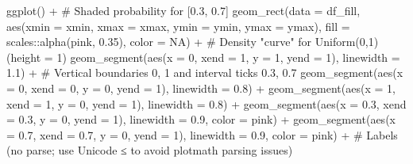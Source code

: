 \documentclass[
  letterpaper,
  DIV=11,
  numbers=noendperiod]{scrreprt}
\newenvironment{Shaded}{\begin{snugshade}}{\end{snugshade}}
\newcommand{\AttributeTok}[1]{\textcolor[rgb]{0.40,0.45,0.13}{#1}}
\newcommand{\CommentTok}[1]{\textcolor[rgb]{0.37,0.37,0.37}{#1}}
\newcommand{\ConstantTok}[1]{\textcolor[rgb]{0.56,0.35,0.01}{#1}}
\newcommand{\DecValTok}[1]{\textcolor[rgb]{0.68,0.00,0.00}{#1}}
\newcommand{\FloatTok}[1]{\textcolor[rgb]{0.68,0.00,0.00}{#1}}
\newcommand{\FunctionTok}[1]{\textcolor[rgb]{0.28,0.35,0.67}{#1}}
\newcommand{\NormalTok}[1]{\textcolor[rgb]{0.00,0.23,0.31}{#1}}
\newcommand{\SpecialCharTok}[1]{\textcolor[rgb]{0.37,0.37,0.37}{#1}}
\begin{document}
\begin{Shaded}
\begin{Highlighting}[]
\FunctionTok{ggplot}\NormalTok{() }\SpecialCharTok{+}
  \CommentTok{\# Shaded probability for [0.3, 0.7]}
  \FunctionTok{geom\_rect}\NormalTok{(}\AttributeTok{data =}\NormalTok{ df\_fill,}
            \FunctionTok{aes}\NormalTok{(}\AttributeTok{xmin =}\NormalTok{ xmin, }\AttributeTok{xmax =}\NormalTok{ xmax, }\AttributeTok{ymin =}\NormalTok{ ymin, }\AttributeTok{ymax =}\NormalTok{ ymax),}
            \AttributeTok{fill =}\NormalTok{ scales}\SpecialCharTok{::}\FunctionTok{alpha}\NormalTok{(pink, }\FloatTok{0.35}\NormalTok{), }\AttributeTok{color =} \ConstantTok{NA}\NormalTok{) }\SpecialCharTok{+}
  \CommentTok{\# Density "curve" for Uniform(0,1) (height = 1)}
  \FunctionTok{geom\_segment}\NormalTok{(}\FunctionTok{aes}\NormalTok{(}\AttributeTok{x =} \DecValTok{0}\NormalTok{, }\AttributeTok{xend =} \DecValTok{1}\NormalTok{, }\AttributeTok{y =} \DecValTok{1}\NormalTok{, }\AttributeTok{yend =} \DecValTok{1}\NormalTok{), }\AttributeTok{linewidth =} \FloatTok{1.1}\NormalTok{) }\SpecialCharTok{+}
  \CommentTok{\# Vertical boundaries 0, 1 and interval ticks 0.3, 0.7}
  \FunctionTok{geom\_segment}\NormalTok{(}\FunctionTok{aes}\NormalTok{(}\AttributeTok{x =} \DecValTok{0}\NormalTok{,   }\AttributeTok{xend =} \DecValTok{0}\NormalTok{,   }\AttributeTok{y =} \DecValTok{0}\NormalTok{, }\AttributeTok{yend =} \DecValTok{1}\NormalTok{), }\AttributeTok{linewidth =} \FloatTok{0.8}\NormalTok{) }\SpecialCharTok{+}
  \FunctionTok{geom\_segment}\NormalTok{(}\FunctionTok{aes}\NormalTok{(}\AttributeTok{x =} \DecValTok{1}\NormalTok{,   }\AttributeTok{xend =} \DecValTok{1}\NormalTok{,   }\AttributeTok{y =} \DecValTok{0}\NormalTok{, }\AttributeTok{yend =} \DecValTok{1}\NormalTok{), }\AttributeTok{linewidth =} \FloatTok{0.8}\NormalTok{) }\SpecialCharTok{+}
  \FunctionTok{geom\_segment}\NormalTok{(}\FunctionTok{aes}\NormalTok{(}\AttributeTok{x =} \FloatTok{0.3}\NormalTok{, }\AttributeTok{xend =} \FloatTok{0.3}\NormalTok{, }\AttributeTok{y =} \DecValTok{0}\NormalTok{, }\AttributeTok{yend =} \DecValTok{1}\NormalTok{),}
               \AttributeTok{linewidth =} \FloatTok{0.9}\NormalTok{, }\AttributeTok{color =}\NormalTok{ pink) }\SpecialCharTok{+}
  \FunctionTok{geom\_segment}\NormalTok{(}\FunctionTok{aes}\NormalTok{(}\AttributeTok{x =} \FloatTok{0.7}\NormalTok{, }\AttributeTok{xend =} \FloatTok{0.7}\NormalTok{, }\AttributeTok{y =} \DecValTok{0}\NormalTok{, }\AttributeTok{yend =} \DecValTok{1}\NormalTok{),}
               \AttributeTok{linewidth =} \FloatTok{0.9}\NormalTok{, }\AttributeTok{color =}\NormalTok{ pink) }\SpecialCharTok{+}
  \CommentTok{\# Labels (no parse; use Unicode ≤ to avoid plotmath parsing issues)}

\end{Highlighting}
\end{Shaded}
\end{document}
